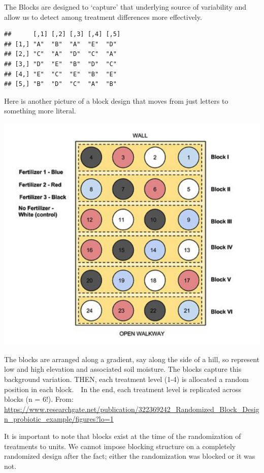 \documentclass[
]{book}
\begin{document}
The Blocks are designed to `capture' that underlying source of variability and allow us to detect among treatment differences more effectively.

\begin{verbatim}
##      [,1] [,2] [,3] [,4] [,5]
## [1,] "A"  "B"  "A"  "E"  "D" 
## [2,] "C"  "A"  "D"  "C"  "A" 
## [3,] "D"  "E"  "B"  "D"  "C" 
## [4,] "E"  "C"  "E"  "B"  "E" 
## [5,] "B"  "D"  "C"  "A"  "B"
\end{verbatim}

Here is another picture of a block design that moves from just letters to something more literal.

\includegraphics[width=8.89in]{images/BlockDesignGraphic}

The blocks are arranged along a gradient, say along the side of a hill, so represent low and high elevation and associated soil moisture. The blocks capture this background variation. THEN, each treatment level (1-4) is allocated a random position in each block.~~In the end, each treatment level is replicated across blocks (n = 6!). From: \url{https://www.researchgate.net/publication/322369242_Randomized_Block_Design_probiotic_example/figures?lo=1}

It is important to note that blocks exist at the time of the randomization of treatments to units. We cannot impose blocking structure on a completely randomized design after the fact; either the randomization was blocked or it was not.
\end{document}
